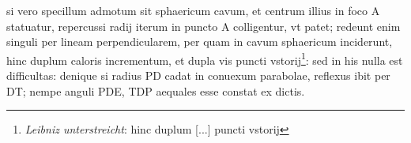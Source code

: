 \pend \pstart [p.~98] [...] si vero specillum  admotum sit sphaericum cavum, et centrum illius in foco\protect{} A statuatur, repercussi radij iterum in puncto A  colligentur, vt patet; redeunt enim singuli per lineam  perpendicularem, per quam in cavum sphaericum inciderunt, hinc duplum caloris incrementum, et dupla  vis puncti vstorij\protect{}\footnote{\textit{Leibniz unterstreicht}: hinc duplum [...] puncti vstorij}: sed in his nulla est difficultas: denique  si radius PD cadat in conuexum parabolae, reflexus  ibit per DT; nempe anguli PDE, TDP aequales  esse constat ex dictis.